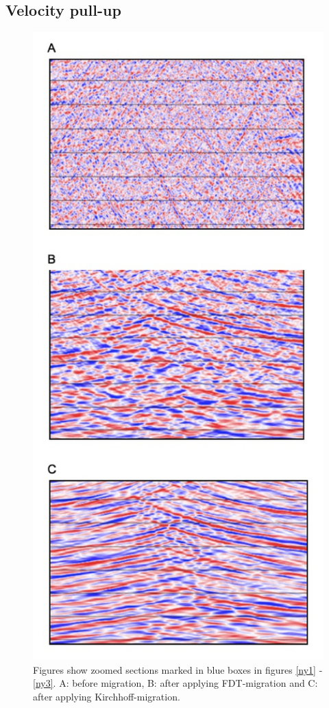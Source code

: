\documentclass[10pt,a4paper]{article}
\begin{document}
\subsection{Velocity pull-up}

\begin{figure}[H]
\includegraphics[scale=0.4]{ny5.jpg}
\caption{Figures show zoomed sections marked in blue boxes in figures \ref{ny1} - \ref{ny3}. 
A: before migration, B: after applying FDT-migration and C: after applying Kirchhoff-migration.}
\label{ny5}
\end{figure}
\end{document}
